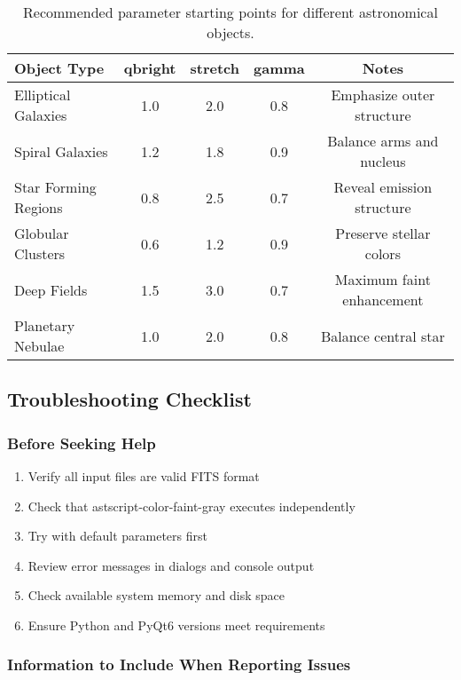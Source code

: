 \documentclass[11pt,a4paper]{article}
\begin{document}
\begin{table}[H]
\centering
\small
\begin{tabular}{@{}lcccc@{}}
\toprule
Object Type & qbright & stretch & gamma & Notes \\
\midrule
Elliptical Galaxies & 1.0 & 2.0 & 0.8 & Emphasize outer structure \\
Spiral Galaxies & 1.2 & 1.8 & 0.9 & Balance arms and nucleus \\
Star Forming Regions & 0.8 & 2.5 & 0.7 & Reveal emission structure \\
Globular Clusters & 0.6 & 1.2 & 0.9 & Preserve stellar colors \\
Deep Fields & 1.5 & 3.0 & 0.7 & Maximum faint enhancement \\
Planetary Nebulae & 1.0 & 2.0 & 0.8 & Balance central star \\
\bottomrule
\end{tabular}
\caption{Recommended parameter starting points for different astronomical
objects.}
\label{tab:object-params}
\end{table}

\subsection{Troubleshooting Checklist}

\subsubsection{Before Seeking Help}

\begin{enumerate}
\item Verify all input files are valid FITS format
\item Check that astscript-color-faint-gray executes independently
\item Try with default parameters first
\item Review error messages in dialogs and console output
\item Check available system memory and disk space
\item Ensure Python and PyQt6 versions meet requirements
\end{enumerate}

\subsubsection{Information to Include When Reporting Issues}
\end{document}
